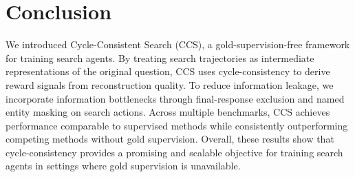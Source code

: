 \section{Conclusion}
We introduced Cycle-Consistent Search (CCS), a gold-supervision-free framework for training search agents. By treating search trajectories as intermediate representations of the original question, CCS uses cycle-consistency to derive reward signals from reconstruction quality. To reduce information leakage, we incorporate information bottlenecks through final-response exclusion and named entity masking on search actions. Across multiple benchmarks, CCS achieves performance comparable to supervised methods while consistently outperforming competing methods without gold supervision. Overall, these results show that cycle-consistency provides a promising and scalable objective for training search agents in settings where gold supervision is unavailable.